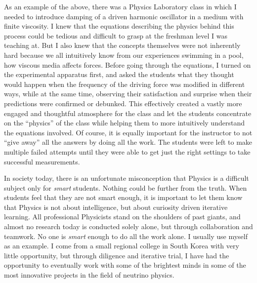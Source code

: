 \documentclass[10pt]{article} %
\begin{document}
As an example of the above, there was a Physics Laboratory class in which I
needed to introduce damping of a driven harmonic oscillator in a medium with
finite viscosity. I knew that the equations describing the physics behind this
process could be tedious and difficult to grasp at the freshman level I was
teaching at. But I also knew that the concepts themselves were not inherently
hard because we all intuitively know from our experiences swimming in a pool,
how viscous media affects forces. Before going through the equations, I turned
on the experimental apparatus first, and asked the students what they thought
would happen when the frequency of the driving force was modified in different
ways, while at the same time, observing their satisfaction and surprise when
their predictions were confirmed or debunked. This effectively created a vastly
more engaged and thoughtful atmosphere for the class and let the students
concentrate on the ``physics'' of the class while helping them to more
intuitively understand the equations involved. Of course, it is equally
important for the instructor to not ``give away'' all the answers by doing all
the work. The students were left to make multiple failed attempts until they
were able to get just the right settings to take successful measurements.

In society today, there is an unfortunate misconception that Physics is a
difficult subject only for \textit{smart} students. Nothing could be further
from the truth. When students feel that they are not smart enough, it is
important to let them know that Physics is not about intelligence, but about
curiosity driven iterative learning. All professional Physicists stand on the
shoulders of past giants, and almost no research today is conducted solely
alone, but through collaboration and teamwork. No one is \textit{smart} enough
to do all the work alone. I usually use myself as an example. I come from a
small regional college in South Korea with very little opportunity, but through
diligence and iterative trial, I have had the opportunity to eventually work
with some of the brightest minds in some of the most innovative projects in the
field of neutrino physics.
\end{document}
